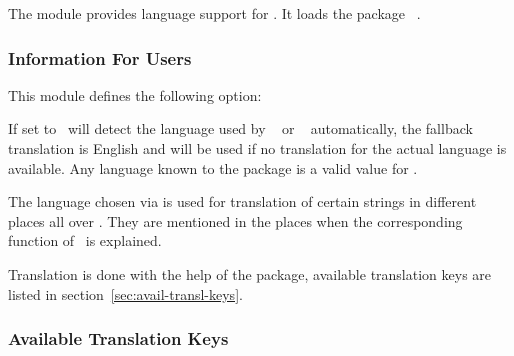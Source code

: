 \documentclass{chemmacros-manual}
\def\chemmodule*#1{\textquotedblleft#1\textquotedblright}%
\begin{document}
The  module provides language support for \chemmacros.  It
loads the package ~\cite{pkg:translations}.

\subsubsection{Information For Users}\label{sec:information-users}

This module defines the following option:
\begin{options}
    If set to  \chemmacros\ will detect the language used by
    ~\cite{pkg:babel} or ~\cite{pkg:polyglossia}
    automatically, the fallback translation is English and will be used if no 
    translation for the actual language is available.  Any language known to
    the  package is a valid value for .
\end{options}

The language chosen via  is used for translation of certain
strings in different places all over \chemmacros.  They are mentioned in the
places when the corresponding function of \chemmacros\ is explained.

Translation is done with the help of the  package, available
translation keys are listed in section~\vref{sec:avail-transl-keys}.

\subsubsection{Available Translation Keys}\label{sec:avail-transl-keys}
\end{document}
